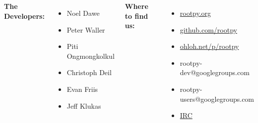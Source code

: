 \documentclass[10pt,professionalfonts,serif,usenames,dvipsnames,svgnames,table]{beamer}
\begin{document}
\begin{frame}
    \begin{large}
    \begin{center}
    \begin{columns}
{\bf The Developers:}
\vspace{.5cm}
\begin{itemize}
    \item Noel Dawe
    \item Peter Waller
    \item Piti Ongmongkolkul
    \item Christoph Deil
    \item Evan Friis
    \item Jeff Klukas
\end{itemize}
{\bf Where to find us:}
\vspace{.5cm}
        \begin{itemize}
            \item \href{http://rootpy.org}{rootpy.org}
            \item \href{https://github.com/rootpy}{github.com/rootpy}
            \item \href{http://www.ohloh.net/p/rootpy}{ohloh.net/p/rootpy}
            \item rootpy-dev@googlegroups.com
            \item rootpy-users@googlegroups.com
            \item \href{http://webchat.freenode.net/?randomnick=1&channels=rootpy&prompt=1}{IRC}
            \end{itemize}
        \end{columns}
    \end{center}
    \end{large}
\end{frame}
\end{document}

